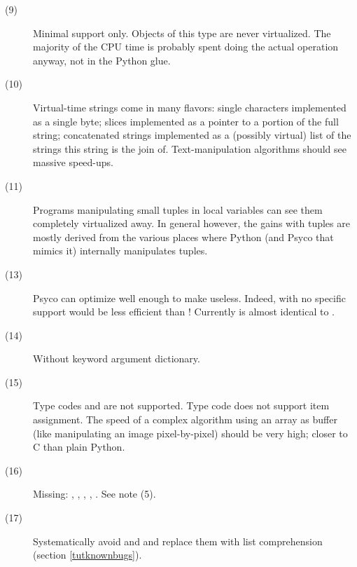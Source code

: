 \documentclass{manual}
\begin{document}
\begin{description}
\item[(9)]
  Minimal support only.  Objects of this type are never virtualized.  The majority of the CPU time is probably spent doing the actual operation anyway, not in the Python glue.

\item[(10)]
  Virtual-time strings come in many flavors: single characters implemented as a single byte; slices implemented as a pointer to a portion of the full string; concatenated strings implemented as a (possibly virtual) list of the strings this string is the join of.  Text-manipulation algorithms should see massive speed-ups.
  
\item[(11)]
  Programs manipulating small tuples in local variables can see them completely virtualized away.  In general however, the gains with tuples are mostly derived from the various places where Python (and Psyco that mimics it) internally manipulates tuples.

\item[(13)]
  Psyco can optimize  well enough to make  useless.  Indeed, with no specific support  would be less efficient than ! Currently  is almost identical to .
  
\item[(14)]
  Without keyword argument dictionary.
  
\item[(15)]
  Type codes  and  are not supported.  Type code  does not support item assignment.  The speed of a complex algorithm using an array as buffer (like manipulating an image pixel-by-pixel) should be very high; closer to C than plain Python.

\item[(16)]
  Missing: , , , , .  See note (5).

\item[(17)]
  Systematically avoid  and  and replace them with list comprehension (section \ref{tutknownbugs}).

\end{description}


\end{document}
